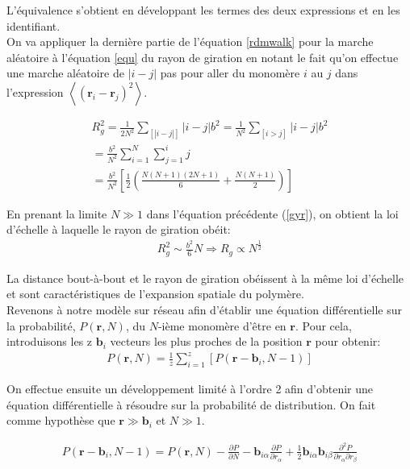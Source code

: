 \documentclass[a4paper,11pt]{article}
\begin{document}
 L'équivalence s'obtient en développant les termes des deux expressions et en les identifiant.\\


On va appliquer la dernière partie de l'équation \ref{rdmwalk} pour la marche aléatoire à l'équation \ref{equ} du rayon de giration en notant le fait qu'on effectue une marche aléatoire de $|i-j|$ pas pour aller du monomère $i$ au $j$ dans l'expression $\left<(\textbf{r}_i - \textbf{r}_j)^2\right>$.

\begin{gather}
R_g^2\text{}=\text{}\frac{1}{2N^2}\sum_{[|i-j|]} |i-j| b^2=\text{}\frac{1}{N^2}\sum_{[i>j]} |i-j| b^2\nonumber \\
=\text{}\frac{b^2}{N^2} \sum_{i=1}^N \sum_{j=1}^{i} j \\
 = \text{}\frac{b^2}{N^2}[\frac{1}{2}(\frac{N(N+1)(2N+1)}{6}+\frac{N(N+1)}{2})]\nonumber
\label{gyr}
\end{gather}

En prenant la limite $N \gg 1$ dans l'équation précédente (\ref{gyr}), on obtient la loi d'échelle à laquelle le rayon de giration obéit:
\begin{eqnarray}
R_g^2\text{}\sim\text{}\frac{b^2}{6}N \Rightarrow R_g\propto N^{\frac12}
\end{eqnarray}

La distance bout-à-bout et le rayon de giration obéissent à la même loi d'échelle et sont caractéristiques de l'expansion spatiale du polymère.\\


Revenons à notre modèle sur réseau afin d'établir une équation différentielle sur la probabilité, $P(\textbf{r},N)$, du $N$-ième monomère d'être en $\textbf{r}$. Pour cela, introduisons les z $\textbf{b}_i$  vecteurs les plus proches de la position $\textbf{r}$ pour obtenir:
\begin{eqnarray}
P(\textbf{r},N)= \frac{1}{z}\sum_{i=1}^{z} \left[P(\textbf{r}-\textbf{b}_i,N-1)\right]
\label{eqdifprob}
\end{eqnarray}

On effectue ensuite un développement limité à l'ordre 2 afin d'obtenir une équation différentielle à résoudre sur la probabilité de distribution. On fait comme hypothèse que $\textbf{r}\gg\textbf{b}_i$ et $N \gg 1$.

\begin{eqnarray}
P(\textbf{r}-\textbf{b}_i,N-1)=P(\textbf{r},N)- \frac{\partial P}{\partial N}-  \textbf{b}_{i\alpha} \frac{\partial P}{\partial r_{\alpha} } + \frac12 \textbf{b}_{i\alpha}\textbf{b}_{i\beta} \frac{\partial ^2 P}{\partial r_{\alpha}\partial r_{\beta} }
\end{eqnarray}
\end{document}
